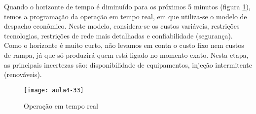 Quando o horizonte de tempo é diminuído para os próximos 5 minutos (figura \ref{fig:aula4-33}), temos a programação da operação em tempo real, em que utiliza-se o modelo de despacho econômico.
Neste modelo, considera-se os custos variáveis, restrições tecnologias,
restrições de rede mais detalhadas e confiabilidade (segurança). Como o horizonte é muito curto, não levamos em conta o custo fixo nem custos de rampa, já que só produzirá quem está ligado no momento exato. Nesta etapa, as principais incertezas são: disponibilidade de equipamentos, injeção intermitente (renováveis).
\begin{figure}[H]
\begin{centering}
\texttt{[image: aula4-33]}\protect\caption{\label{fig:aula4-33} Operação em tempo real}
\end{centering}
\end{figure}